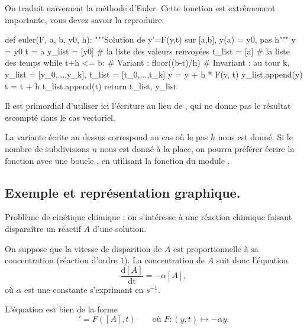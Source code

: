 On traduit naïvement la méthode d'Euler. Cette fonction est extrêmement importante, vous devez savoir la reproduire.

\begin{pyverbatim}
def euler(F, a, b, y0, h):
    """Solution de y'=F(y,t) sur [a,b], y(a) = y0, pas h"""
    y = y0
    t = a
    y_list = [y0] # la liste des valeurs renvoyées
    t_list = [a] # la liste des temps
    while t+h <= b:
        # Variant : floor((b-t)/h)
        # Invariant : au tour k, y_list = [y_0,...,y_k], t_list = [t_0,...,t_k]
        y = y + h * F(y, t)
        y_list.append(y)
        t = t + h
        t_list.append(t)
    return t_list, y_list
\end{pyverbatim}
\begin{rem}
  Il est primordial d'utiliser ici l'écriture  au lieu de  , qui ne donne pas le résultat escompté dans le cas vectoriel. 
\end{rem}

\begin{rem}
  La variante écrite au dessus correspond au cas où le pas $h$ nous est donné. 
  Si le nombre de subdivisions $n$ nous est donné à la place, on pourra préférer écrire la fonction avec une boucle , en utilisant la fonction  du module .
\end{rem}

\subsection{Exemple et représentation graphique.}

Problème de cinétique chimique : on s'intéresse à une réaction chimique
faisant disparaître un réactif $A$ d'une solution.

On suppose que la vitesse de disparition de $A$ est proportionnelle
à sa concentration (réaction d'ordre $1$). La concentration de $A$ suit donc l'équation
\begin{equation*}
  \dfrac{\textrm{d}[A]}{\textrm{dt}} = -\alpha [A],
\end{equation*}
où $\alpha$ est une constante s'exprimant en $s^{-1}$.%

L'équation est bien de la forme
\begin{equation*}
  [A]' = F([A],t) \qquad \text{où }F : (y,t)\mapsto -\alpha y.
\end{equation*}

